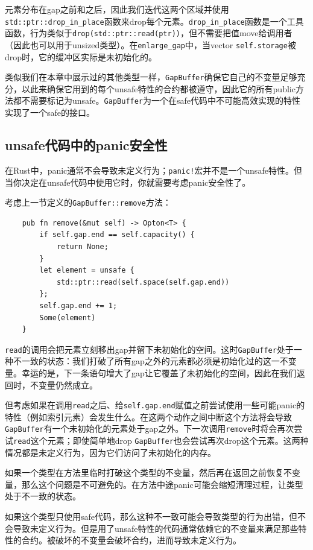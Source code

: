 元素分布在gap之前和之后，因此我们迭代这两个区域并使用\texttt{std::ptr::drop\_in\_place}函数来drop每个元素。\texttt{drop\_in\_place}函数是一个工具函数，行为类似于\texttt{drop(std::ptr::read(ptr))}，但不需要把值move给调用者（因此也可以用于unsized类型）。在\texttt{enlarge\_gap}中，当vector \texttt{self.storage}被drop时，它的缓冲区实际是未初始化的。

类似我们在本章中展示过的其他类型一样，\texttt{GapBuffer}确保它自己的不变量足够充分，以此来确保它用到的每个unsafe特性的合约都被遵守，因此它的所有public方法都不需要标记为unsafe。\texttt{GapBuffer}为一个在safe代码中不可能高效实现的特性实现了一个safe的接口。

\subsection{unsafe代码中的panic安全性}
在Rust中，panic通常不会导致未定义行为；\texttt{panic!}宏并不是一个unsafe特性。但当你决定在unsafe代码中使用它时，你就需要考虑panic安全性了。

考虑上一节定义的\texttt{GapBuffer::remove}方法：
\begin{verbatim}
    pub fn remove(&mut self) -> Opton<T> {
        if self.gap.end == self.capacity() {
            return None;
        }
        let element = unsafe {
            std::ptr::read(self.space(self.gap.end))
        };
        self.gap.end += 1;
        Some(element)
    }
\end{verbatim}

\texttt{read}的调用会把元素立刻移出gap并留下未初始化的空间。这时\texttt{GapBuffer}处于一种不一致的状态：我们打破了所有gap之外的元素都必须是初始化过的这一不变量。幸运的是，下一条语句增大了gap让它覆盖了未初始化的空间，因此在我们返回时，不变量仍然成立。

但考虑如果在调用\texttt{read}之后、给\texttt{self.gap.end}赋值之前尝试使用一些可能panic的特性（例如索引元素）会发生什么。在这两个动作之间中断这个方法将会导致\texttt{GapBuffer}有一个未初始化的元素处于gap之外。下一次调用\texttt{remove}时将会再次尝试\texttt{read}这个元素；即使简单地drop \texttt{GapBuffer}也会尝试再次drop这个元素。这两种情况都是未定义行为，因为它们访问了未初始化的内存。

如果一个类型在方法里临时打破这个类型的不变量，然后再在返回之前恢复不变量，那么这个问题是不可避免的。在方法中途panic可能会缩短清理过程，让类型处于不一致的状态。

如果这个类型只使用safe代码，那么这种不一致可能会导致类型的行为出错，但不会导致未定义行为。但是用了unsafe特性的代码通常依赖它的不变量来满足那些特性的合约。被破坏的不变量会破坏合约，进而导致未定义行为。

